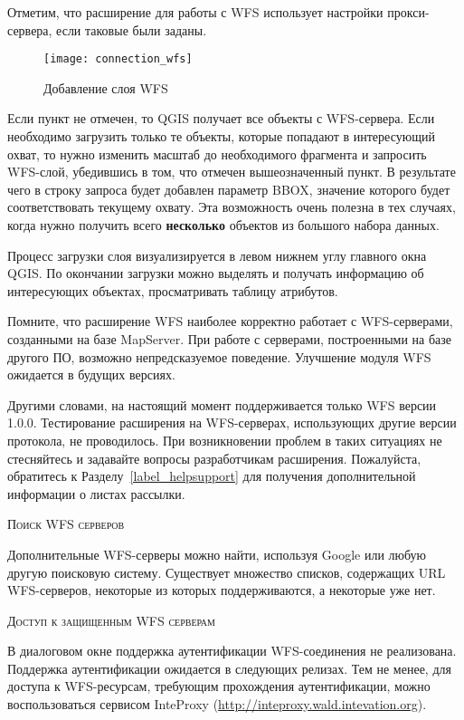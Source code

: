 Отметим, что расширение для работы с WFS использует настройки
прокси-сервера, если таковые были заданы.

\begin{figure}[ht]
  \centering
    \texttt{[image: connection\_wfs]}
    \caption{Добавление слоя WFS \wincaption}\label{fig:wfs_dmsolutions}
\end{figure}

Если пункт 
не отмечен, то QGIS получает все объекты с WFS-сервера. Если необходимо
загрузить только те объекты, которые попадают в интересующий охват,
то нужно изменить масштаб до необходимого фрагмента и запросить WFS-слой,
убедившись в том, что отмечен вышеозначенный пункт. В результате
чего в строку запроса будет добавлен параметр BBOX, значение которого будет
соответствовать текущему охвату. Эта возможность очень полезна в тех случаях,
когда нужно получить всего \textbf{несколько} объектов из большого набора
данных.

Процесс загрузки слоя визуализируется в левом нижнем углу главного окна
QGIS. По окончании загрузки можно выделять и получать информацию об
интересующих объектах, просматривать таблицу атрибутов.

Помните, что расширение WFS наиболее корректно работает с WFS-серверами,
созданными на базе MapServer. При работе с серверами, построенными на базе
другого ПО, возможно непредсказуемое поведение. Улучшение модуля WFS
ожидается в будущих версиях.

Другими словами, на настоящий момент поддерживается только WFS версии 1.0.0.
Тестирование расширения на WFS-серверах, использующих другие версии
протокола, не проводилось. При возникновении проблем в таких ситуациях
не стесняйтесь и задавайте вопросы разработчикам расширения.
Пожалуйста, обратитесь к Разделу~\ref{label_helpsupport} для получения
дополнительной информации о листах рассылки.

\begin{Tip}[htb]\caption{\textsc{Поиск WFS серверов}}
Дополнительные WFS-серверы можно найти, используя Google
или любую другую поисковую систему. Существует множество списков, содержащих
URL WFS-серверов, некоторые из которых поддерживаются, а некоторые уже нет.
\end{Tip}

\begin{Tip}[htb]\caption{\textsc{Доступ к защищенным WFS серверам}}
В диалоговом окне  поддержка
аутентификации WFS-соединения не реализована. Поддержка аутентификации
ожидается в следующих релизах. Тем не менее, для доступа к WFS-ресурсам,
требующим прохождения аутентификации, можно воспользоваться сервисом
InteProxy (\url{http://inteproxy.wald.intevation.org}).
\end{Tip}

\FloatBarrier
